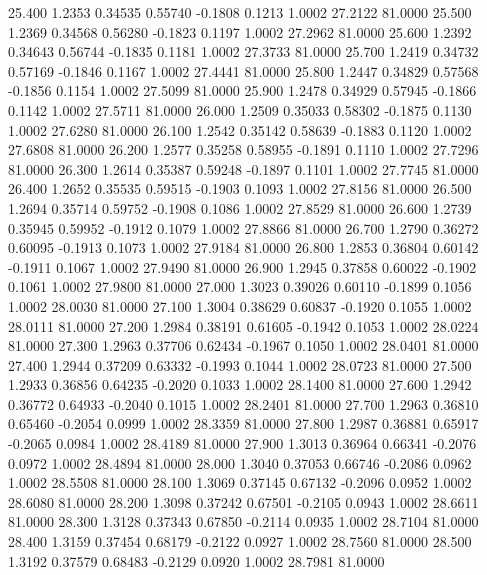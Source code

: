   25.400   1.2353   0.34535   0.55740  -0.1808   0.1213   1.0002  27.2122  81.0000
  25.500   1.2369   0.34568   0.56280  -0.1823   0.1197   1.0002  27.2962  81.0000
  25.600   1.2392   0.34643   0.56744  -0.1835   0.1181   1.0002  27.3733  81.0000
  25.700   1.2419   0.34732   0.57169  -0.1846   0.1167   1.0002  27.4441  81.0000
  25.800   1.2447   0.34829   0.57568  -0.1856   0.1154   1.0002  27.5099  81.0000
  25.900   1.2478   0.34929   0.57945  -0.1866   0.1142   1.0002  27.5711  81.0000
  26.000   1.2509   0.35033   0.58302  -0.1875   0.1130   1.0002  27.6280  81.0000
  26.100   1.2542   0.35142   0.58639  -0.1883   0.1120   1.0002  27.6808  81.0000
  26.200   1.2577   0.35258   0.58955  -0.1891   0.1110   1.0002  27.7296  81.0000
  26.300   1.2614   0.35387   0.59248  -0.1897   0.1101   1.0002  27.7745  81.0000
  26.400   1.2652   0.35535   0.59515  -0.1903   0.1093   1.0002  27.8156  81.0000
  26.500   1.2694   0.35714   0.59752  -0.1908   0.1086   1.0002  27.8529  81.0000
  26.600   1.2739   0.35945   0.59952  -0.1912   0.1079   1.0002  27.8866  81.0000
  26.700   1.2790   0.36272   0.60095  -0.1913   0.1073   1.0002  27.9184  81.0000
  26.800   1.2853   0.36804   0.60142  -0.1911   0.1067   1.0002  27.9490  81.0000
  26.900   1.2945   0.37858   0.60022  -0.1902   0.1061   1.0002  27.9800  81.0000
  27.000   1.3023   0.39026   0.60110  -0.1899   0.1056   1.0002  28.0030  81.0000
  27.100   1.3004   0.38629   0.60837  -0.1920   0.1055   1.0002  28.0111  81.0000
  27.200   1.2984   0.38191   0.61605  -0.1942   0.1053   1.0002  28.0224  81.0000
  27.300   1.2963   0.37706   0.62434  -0.1967   0.1050   1.0002  28.0401  81.0000
  27.400   1.2944   0.37209   0.63332  -0.1993   0.1044   1.0002  28.0723  81.0000
  27.500   1.2933   0.36856   0.64235  -0.2020   0.1033   1.0002  28.1400  81.0000
  27.600   1.2942   0.36772   0.64933  -0.2040   0.1015   1.0002  28.2401  81.0000
  27.700   1.2963   0.36810   0.65460  -0.2054   0.0999   1.0002  28.3359  81.0000
  27.800   1.2987   0.36881   0.65917  -0.2065   0.0984   1.0002  28.4189  81.0000
  27.900   1.3013   0.36964   0.66341  -0.2076   0.0972   1.0002  28.4894  81.0000
  28.000   1.3040   0.37053   0.66746  -0.2086   0.0962   1.0002  28.5508  81.0000
  28.100   1.3069   0.37145   0.67132  -0.2096   0.0952   1.0002  28.6080  81.0000
  28.200   1.3098   0.37242   0.67501  -0.2105   0.0943   1.0002  28.6611  81.0000
  28.300   1.3128   0.37343   0.67850  -0.2114   0.0935   1.0002  28.7104  81.0000
  28.400   1.3159   0.37454   0.68179  -0.2122   0.0927   1.0002  28.7560  81.0000
  28.500   1.3192   0.37579   0.68483  -0.2129   0.0920   1.0002  28.7981  81.0000
